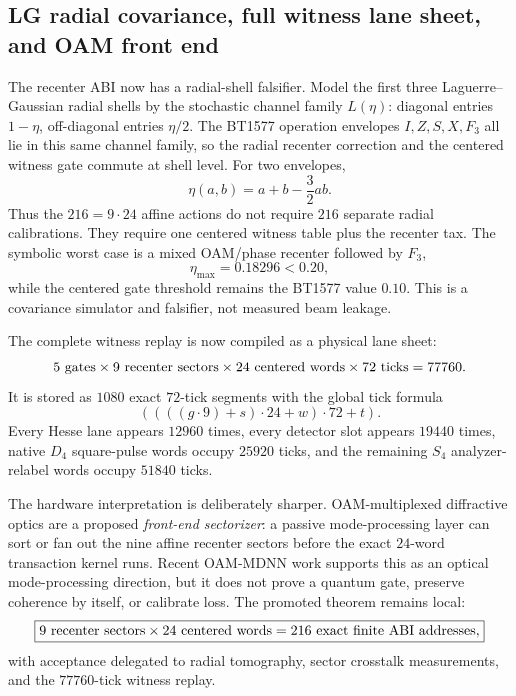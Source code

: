 \subsection{LG radial covariance, full witness lane sheet, and OAM front end}
\label{sec:bt1589-bt1591-radial-lane-frontend}

The recenter ABI now has a radial-shell falsifier.  Model the first three
Laguerre--Gaussian radial shells by the stochastic channel family \(L(\eta)\):
diagonal entries \(1-\eta\), off-diagonal entries \(\eta/2\).  The BT1577
operation envelopes \(I,Z,S,X,F_3\) all lie in this same channel family, so the
radial recenter correction and the centered witness gate commute at shell level.
For two envelopes,
\[
  \eta(a,b)=a+b-\frac{3}{2}ab.
\]
Thus the \(216=9\cdot24\) affine actions do not require \(216\) separate radial
calibrations.  They require one centered witness table plus the recenter tax.
The symbolic worst case is a mixed OAM/phase recenter followed by \(F_3\),
\[
  \eta_{\max}=0.18296 < 0.20,
\]
while the centered gate threshold remains the BT1577 value \(0.10\).  This is a
covariance simulator and falsifier, not measured beam leakage.

The complete witness replay is now compiled as a physical lane sheet:
\[
  5\ {\rm gates}\times 9\ {\rm recenter\ sectors}\times
  24\ {\rm centered\ words}\times 72\ {\rm ticks}=77760.
\]
It is stored as \(1080\) exact \(72\)-tick segments with the global tick formula
\[
  ((((g\cdot9)+s)\cdot24+w)\cdot72+t).
\]
Every Hesse lane appears \(12960\) times, every detector slot appears \(19440\)
times, native \(D_4\) square-pulse words occupy \(25920\) ticks, and the
remaining \(S_4\) analyzer-relabel words occupy \(51840\) ticks.

The hardware interpretation is deliberately sharper.  OAM-multiplexed
diffractive optics are a proposed \emph{front-end sectorizer}: a passive
mode-processing layer can sort or fan out the nine affine recenter sectors before
the exact \(24\)-word transaction kernel runs.  Recent OAM-MDNN work supports
this as an optical mode-processing direction, but it does not prove a quantum
gate, preserve coherence by itself, or calibrate loss.  The promoted theorem
remains local:
\[
  \boxed{9\ {\rm recenter\ sectors}\times24\ {\rm centered\ words}
  =216\ {\rm exact\ finite\ ABI\ addresses},}
\]
with acceptance delegated to radial tomography, sector crosstalk measurements,
and the \(77760\)-tick witness replay.
